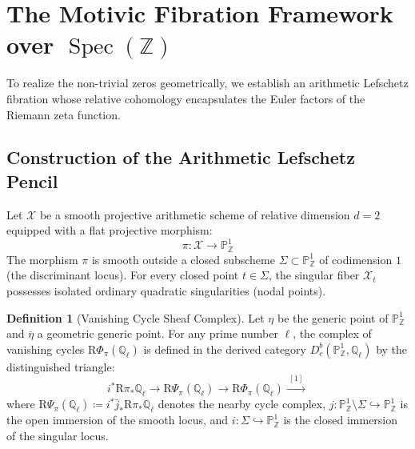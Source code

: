 \documentclass[11pt,a4paper]{article}
\theoremstyle{definition}
\newtheorem{definition}[theorem]{Definition}
\begin{document}
\newpage

\section{The Motivic Fibration Framework over \texorpdfstring{$\operatorname{Spec}(\mathbb{Z})$}{Spec(Z)}}
To realize the non-trivial zeros geometrically, we establish an arithmetic Lefschetz fibration whose relative cohomology encapsulates the Euler factors of the Riemann zeta function.

\subsection{Construction of the Arithmetic Lefschetz Pencil}
Let $\mathcal{X}$ be a smooth projective arithmetic scheme of relative dimension $d = 2$ equipped with a flat projective morphism:
\begin{equation}
\pi : \mathcal{X} \longrightarrow \mathbb{P}^1_{\mathbb{Z}}
\end{equation}
The morphism $\pi$ is smooth outside a closed subscheme $\Sigma \subset \mathbb{P}^1_{\mathbb{Z}}$ of codimension $1$ (the discriminant locus). For every closed point $t \in \Sigma$, the singular fiber $\mathcal{X}_t$ possesses isolated ordinary quadratic singularities (nodal points).

\begin{definition}[Vanishing Cycle Sheaf Complex]\label{def:vanishing_cycles}
Let $\eta$ be the generic point of $\mathbb{P}^1_{\mathbb{Z}}$ and $\bar{\eta}$ a geometric generic point. For any prime number $\ell$, the complex of vanishing cycles $\mathrm{R}\Phi_\pi(\mathbb{Q}_\ell)$ is defined in the derived category $D^b_c(\mathbb{P}^1_{\mathbb{Z}}, \mathbb{Q}_\ell)$ by the distinguished triangle:
\begin{equation}\label{eq:vanishing_triangle}
i^* \mathrm{R}\pi_* \mathbb{Q}_\ell \longrightarrow \mathrm{R}\Psi_\pi(\mathbb{Q}_\ell) \longrightarrow \mathrm{R}\Phi_\pi(\mathbb{Q}_\ell) \xrightarrow{\;[1]\;}
\end{equation}
where $\mathrm{R}\Psi_\pi(\mathbb{Q}_\ell) \coloneqq i^* \bar{j}_* \mathrm{R}\pi_* \mathbb{Q}_\ell$ denotes the nearby cycle complex, $j : \mathbb{P}^1_{\mathbb{Z}} \setminus \Sigma \hookrightarrow \mathbb{P}^1_{\mathbb{Z}}$ is the open immersion of the smooth locus, and $i : \Sigma \hookrightarrow \mathbb{P}^1_{\mathbb{Z}}$ is the closed immersion of the singular locus.
\end{definition}
\end{document}
